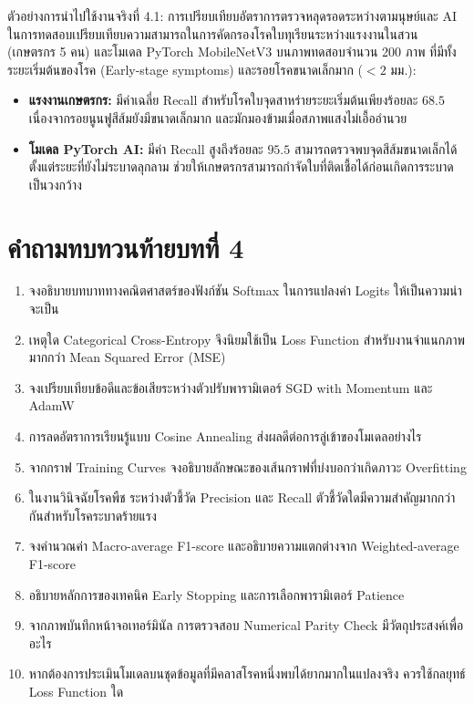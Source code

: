 \begin{casestudybox}{ตัวอย่างการนำไปใช้งานจริงที่ 4.1: การเปรียบเทียบอัตราการตรวจหลุดรอดระหว่างตามนุษย์และ AI}
ในการทดสอบเปรียบเทียบความสามารถในการคัดกรองโรคใบทุเรียนระหว่างแรงงานในสวน (เกษตรกร 5 คน) และโมเดล PyTorch MobileNetV3 บนภาพทดสอบจำนวน 200 ภาพ ที่มีทั้งระยะเริ่มต้นของโรค (Early-stage symptoms) และรอยโรคขนาดเล็กมาก ($< 2$ มม.):
\begin{itemize}[leftmargin=1.4em, itemsep=2pt]
    \item \textbf{แรงงานเกษตรกร:} มีค่าเฉลี่ย Recall สำหรับโรคใบจุดสาหร่ายระยะเริ่มต้นเพียงร้อยละ $68.5$ เนื่องจากรอยนูนฟูสีส้มยังมีขนาดเล็กมาก และมักมองข้ามเมื่อสภาพแสงไม่เอื้ออำนวย
    \item \textbf{โมเดล PyTorch AI:} มีค่า Recall สูงถึงร้อยละ $95.5$ สามารถตรวจพบจุดสีส้มขนาดเล็กได้ตั้งแต่ระยะที่ยังไม่ระบาดลุกลาม ช่วยให้เกษตรกรสามารถกำจัดใบที่ติดเชื้อได้ก่อนเกิดการระบาดเป็นวงกว้าง
\end{itemize}
\end{casestudybox}

\section*{คำถามทบทวนท้ายบทที่ 4}
\begin{enumerate}[leftmargin=1.8em, itemsep=4pt]
    \item จงอธิบายบทบาททางคณิตศาสตร์ของฟังก์ชัน Softmax ในการแปลงค่า Logits ให้เป็นความน่าจะเป็น
    \item เหตุใด Categorical Cross-Entropy จึงนิยมใช้เป็น Loss Function สำหรับงานจำแนกภาพมากกว่า Mean Squared Error (MSE)
    \item จงเปรียบเทียบข้อดีและข้อเสียระหว่างตัวปรับพารามิเตอร์ SGD with Momentum และ AdamW
    \item การลดอัตราการเรียนรู้แบบ Cosine Annealing ส่งผลดีต่อการลู่เข้าของโมเดลอย่างไร
    \item จากกราฟ Training Curves จงอธิบายลักษณะของเส้นกราฟที่บ่งบอกว่าเกิดภาวะ Overfitting
    \item ในงานวินิจฉัยโรคพืช ระหว่างตัวชี้วัด Precision และ Recall ตัวชี้วัดใดมีความสำคัญมากกว่ากันสำหรับโรคระบาดร้ายแรง
    \item จงคำนวณค่า Macro-average F1-score และอธิบายความแตกต่างจาก Weighted-average F1-score
    \item อธิบายหลักการของเทคนิค Early Stopping และการเลือกพารามิเตอร์ Patience
    \item จากภาพบันทึกหน้าจอเทอร์มินัล การตรวจสอบ Numerical Parity Check มีวัตถุประสงค์เพื่ออะไร
    \item หากต้องการประเมินโมเดลบนชุดข้อมูลที่มีคลาสโรคหนึ่งพบได้ยากมากในแปลงจริง ควรใช้กลยุทธ์ Loss Function ใด
\end{enumerate}

